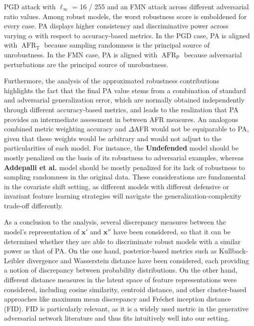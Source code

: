 \begin{table}[h]
{        PGD attack with $\ell_\infty$ = 16 / 255 and an FMN attack across different adversarial 
        ratio values. Among robust models, the worst robustness score is emboldened for every case.
        PA displays higher consistency and discriminative power across varying $\alpha$ with respect to 
        accuracy-based metrics. In the PGD case, PA is aligned with $\operatorname{AFR}_{\text{T}}$ because
        sampling randomness is the principal source of unrobustness. In the FMN case, PA is aligned with 
        $\operatorname{AFR}_{\text{P}}$ because adversarial perturbations are the principal source of unrobustness.
    }
    \label{tab:pa_afrpred_comparison_table}
\end{table}

Furthermore, the analysis of the approximated robustness contributions highlights the fact that 
the final PA value stems from a combination of standard and adversarial generalization error, which 
are normally obtained independently through different accuracy-based metrics, and leads to 
the realization that PA provides an intermediate assessment in between AFR measures. An analogous 
combined metric weighting accuracy and $\Delta$AFR would not be equiparable to PA, given that these 
weights would be arbitrary and would not adjust to the particularities of each model. For instance, the 
{\color{tab:orange} \textbf{Undefended}} model should be mostly penalized on the basis of its
robustness to adversarial examples, whereas {\color{tab:purple} \textbf{Addepalli et al.}}
model should be mostly penalized for its lack of robustness to sampling randomness in the
original data. These considerations are fundamental in the covariate shift setting, as
different models with different defensive or invariant feature learning strategies will
navigate the generalization-complexity trade-off differently.

As a conclusion to the analysis, several discrepancy measures between 
the model's representation of $\bm{x}'$ and $\bm{x}''$ have been considered, so that it can be 
determined whether they are able to discriminate robust models with a similar power as that of PA. 
On the one hand, posterior-based metrics such as Kullback-Leibler divergence 
and Wasserstein distance have been considered, each providing a notion of discrepancy between
probability distributions. On the other hand, different distance measures in the latent space of
feature representations were considered, including cosine similarity, centroid distance,
and other cluster-based approaches like maximum mean discrepancy and Fr\'echet inception distance 
(FID). FID is particularly relevant, as it is a widely used metric in the generative adversarial network 
literature and thus fits intuitively well into our setting. \\

